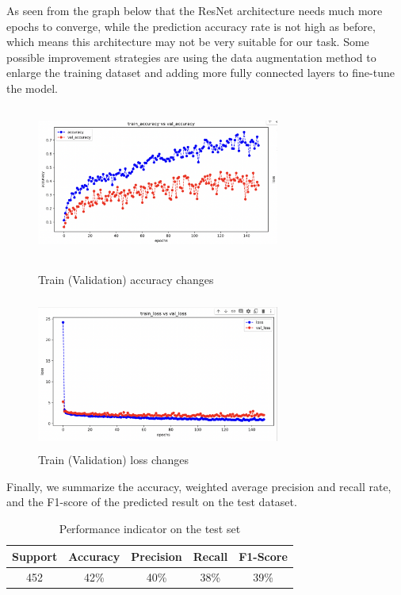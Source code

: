 As seen from the graph below that the ResNet architecture needs much more epochs to converge, while the prediction accuracy rate is not high as before, which means this architecture may not be very suitable for our task. Some possible improvement strategies are using the data augmentation method to enlarge the training dataset and adding more fully connected layers to fine-tune the model.

\begin{figure}[H]
    \begin{minipage}[t]{0.47\textwidth}
        \centering\includegraphics[width=8cm, height=5cm]{./figures/res1.jpg}
        \caption{Train (Validation) accuracy changes}
        \label{pic:correct2}
    \end{minipage}
    \qquad
    \begin{minipage}[t]{0.47\textwidth}
        \centering\includegraphics[width=8cm, height=5cm]{./figures/res2.jpg}
        \caption{Train (Validation) loss changes}
        \label{pic:wrong2}
    \end{minipage}
    
\end{figure}

Finally, we summarize the accuracy, weighted average precision and recall rate, and the F1-score of the predicted result on the test dataset.

\begin{table}[!htbp]
    \small
	\centering
	\begin{tabularx}{0.6\textwidth}{ccccc}
		\toprule
		\textbf{Support}
       &  \textbf{Accuracy}
        & \textbf{Precision} 
        & \textbf{Recall} 
        & \textbf{F1-Score} \\

        \midrule
        452
        & 42\%
        & 40\%
        & 38\%
        & 39\%\\
		\bottomrule
	\end{tabularx}%
	\label{tab:result3}%
	\caption{Performance indicator on the test set}
\end{table}%

